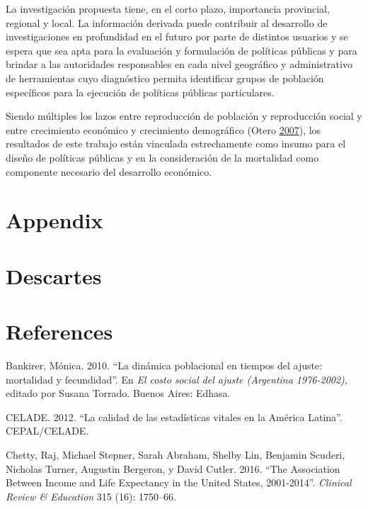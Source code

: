 \documentclass[12pt,spanish,]{article}
\begin{document}
La investigación propuesta tiene, en el corto plazo, importancia
provincial, regional y local. La información derivada puede contribuir
al desarrollo de investigaciones en profundidad en el futuro por parte
de distintos usuarios y se espera que sea apta para la evaluación y
formulación de políticas públicas y para brindar a las autoridades
responsables en cada nivel geográfico y administrativo de herramientas
cuyo diagnóstico permita identificar grupos de población específicos
para la ejecución de políticas públicas particulares.

Siendo múltiples los lazos entre reproducción de población y
reproducción social y entre crecimiento económico y crecimiento
demográfico (Otero \protect\hyperlink{ref-Otero2007}{2007}), los
resultados de este trabajo están vinculada estrechamente como insumo
para el diseño de políticas públicas y en la consideración de la
mortalidad como componente necesario del desarrollo económico.

\parskip=5pt \parindent=0pt 

\appendix

\hypertarget{sec:append}{%
\section{Appendix}\label{sec:append}}

\hypertarget{descartes}{%
\section{Descartes}\label{descartes}}

\hypertarget{references}{%
\section{References}\label{references}}

\hypertarget{refs}{}
\leavevmode\hypertarget{ref-Bankirer2010}{}%
Bankirer, Mónica. 2010. ``La dinámica poblacional en tiempos del ajuste:
mortalidad y fecundidad''. En \emph{El costo social del ajuste
(Argentina 1976-2002)}, editado por Susana Torrado. Buenos Aires:
Edhasa.

\leavevmode\hypertarget{ref-CELADE2012}{}%
CELADE. 2012. ``La calidad de las estadísticas vitales en la América
Latina''. CEPAL/CELADE.

\leavevmode\hypertarget{ref-ChettyEtAl2016}{}%
Chetty, Raj, Michael Stepner, Sarah Abraham, Shelby Lin, Benjamin
Scuderi, Nicholas Turner, Augustin Bergeron, y David Cutler. 2016. ``The
Association Between Income and Life Expectancy in the United States,
2001-2014''. \emph{Clinical Review \& Education} 315 (16): 1750--66.
\end{document}
